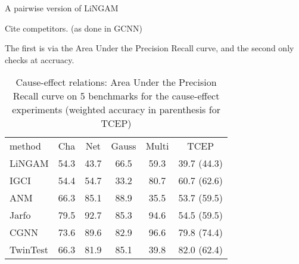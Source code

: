A pairwise version of LiNGAM \cite{shimizu2011directlingam}



Cite competitors. (as done in GCNN)

The first is via the Area Under the Precision Recall curve, and the second 
only checks at accruacy. 

\begin{table}[H]
    \centering


    \begin{tabular}{lccccc}
        \hline method & Cha & Net & Gauss & Multi & TCEP \\
        LiNGAM & 54.3 & 43.7 & 66.5 & 59.3 & 39.7 (44.3) \\
        IGCI & 54.4 & 54.7 & 33.2 & 80.7 & 60.7 (62.6) \\
        ANM & 66.3 & 85.1 & 88.9 & 35.5 & 53.7 (59.5) \\
        Jarfo & 79.5 & 92.7 & 85.3 & 94.6 & 54.5 (59.5) \\
        CGNN  & 73.6 & 89.6 & 82.9 & 96.6 & 79.8 (74.4) \\
        \hline TwinTest & 66.3 & 81.9 & 85.1 & 39.8 & 82.0 (62.4) \\
        \hline
    \end{tabular}

    \caption{Cause-effect relations: Area Under the Precision Recall curve
     on 5 benchmarks for the cause-effect experiments (weighted accuracy 
     in parenthesis for TCEP)}   
    \label{tab:AUPR}
\end{table}

